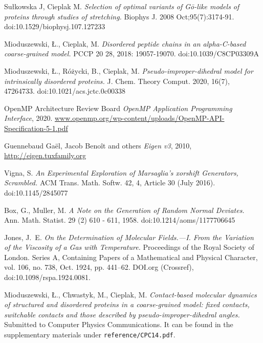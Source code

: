 \documentclass[licencjacka,en]{pracamgr}
\begin{document}
\begin{thebibliography}{99}
 Sułkowska J, Cieplak M. \textit{Selection of optimal variants of Gō-like models of proteins through studies of stretching.} Biophys J. 2008 Oct;95(7):3174-91. doi:10.1529/biophysj.107.127233

 Mioduszewski, Ł., Cieplak, M. \textit{Disordered peptide chains in an alpha-C-based coarse-grained model.} PCCP 20 28, 2018: 19057-19070. doi:10.1039/C8CP03309A

 Mioduszewski, Ł., Różycki, B., Cieplak, M. \textit{Pseudo-improper-dihedral model for intrinsically disordered proteins.} J. Chem. Theory Comput. 2020, 16(7), 47264733. doi:10.1021/acs.jctc.0c00338

 OpenMP Architecture Review Board \textit{OpenMP
Application Programming
Interface}, 2020. \url{www.openmp.org/wp-content/uploads/OpenMP-API-Specification-5-1.pdf}

 {Guennebaud Ga\"{e}l, Jacob Beno\^{i}t and others} \textit{Eigen v3}, 2010, \url{http://eigen.tuxfamily.org}

 Vigna, S. \textit{An Experimental Exploration of Marsaglia's xorshift Generators, Scrambled.} ACM Trans. Math. Softw. 42, 4, Article 30 (July 2016). doi:10.1145/2845077

 Box, G., Muller, M. \textit{A Note on the Generation of Random Normal Deviates.} Ann. Math. Statist. 29 (2) 610 - 611, 1958. doi:10.1214/aoms/1177706645

 Jones, J.~E. \textit{On the Determination of Molecular Fields.—I. From the Variation of the Viscosity of a Gas with Temperature.} Proceedings of the Royal Society of London. Series A, Containing Papers of a Mathematical and Physical Character, vol. 106, no. 738, Oct. 1924, pp. 441–62. DOI.org (Crossref), doi:10.1098/rspa.1924.0081.

 Mioduszewski, Ł., Chwastyk, M., Cieplak, M. \textit{Contact-based molecular dynamics of structured and
disordered proteins in a coarse-grained model: fixed
contacts, switchable contacts and those described by
pseudo-improper-dihedral angles.} Submitted to Computer Physics Communications. It can be found in the supplementary materials under \texttt{reference/CPC14.pdf}. 


\end{thebibliography}
\end{document}
